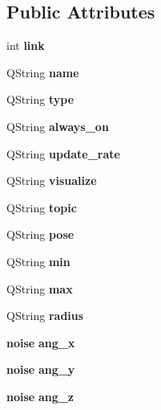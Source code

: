 \subsection*{Public Attributes}
\begin{DoxyCompactItemize}
\item 
int {\bfseries link}\label{classsensor_a62c807c0134db90db694060d50796af9}

\item 
Q\+String {\bfseries name}\label{classsensor_adf6d5ea60239f8f0602c7ab108a4bb14}

\item 
Q\+String {\bfseries type}\label{classsensor_aac06ba4cdfb64242e6034cec7aa77466}

\item 
Q\+String {\bfseries always\+\_\+on}\label{classsensor_a235036fbaa3851d200968cee8a63bc8a}

\item 
Q\+String {\bfseries update\+\_\+rate}\label{classsensor_aecf89b2d361ba41912cbcfcd2293245a}

\item 
Q\+String {\bfseries visualize}\label{classsensor_a586836b4d9cce82347979494f3fe536d}

\item 
Q\+String {\bfseries topic}\label{classsensor_a42ed1ba21317f68281251ab4a5f7722b}

\item 
Q\+String {\bfseries pose}\label{classsensor_a845ef2d59cfb88f194f422a55ab715d6}

\item 
Q\+String {\bfseries min}\label{classsensor_abe9982a912abf6157fb8dda85e6c55cc}

\item 
Q\+String {\bfseries max}\label{classsensor_a6d60d7063d97505b219dc31b232490b0}

\item 
Q\+String {\bfseries radius}\label{classsensor_a7cfde46e9e8109d77935172f11ea3edb}

\item 
{\bf noise} {\bfseries ang\+\_\+x}\label{classsensor_a2bcc89e5c53b5130ce8e607dc4c822ca}

\item 
{\bf noise} {\bfseries ang\+\_\+y}\label{classsensor_a8e521d957b9c24e74545ecac81568e49}

\item 
{\bf noise} {\bfseries ang\+\_\+z}\label{classsensor_a6b6c8d521f150568b74d2b91af195edd}


\end{DoxyCompactItemize}
